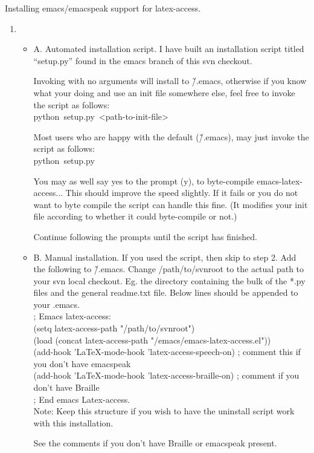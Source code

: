 \documentclass[12pt,a4paper]{report}
\begin{document}
Installing emacs/emacspeak support for latex-access.

\begin{enumerate}
\item
\begin{itemize}
  \item A. Automated installation script.
  I have built an installation script titled ``setup.py'' found in the emacs
branch of this svn checkout.

Invoking with no arguments will install to \~/.emacs, otherwise if you know
what your doing and use an init file somewhere else, feel free to invoke
the script as follows:\\
\mbox{python setup.py <path-to-init-file>}

Most users who are happy with the default (\~/.emacs), may just invoke
the script as follows:\\
\mbox{python setup.py}

You may as well say yes to the prompt (y), to byte-compile
emacs-latex-access... This should improve the speed slightly. If it
fails or you do not want to byte compile the script can handle this
fine. (It modifies your init file according to whether it could
byte-compile or not.)

Continue following the prompts until the script has finished.
\item B. Manual installation. If you used the script, then skip to step
  2.
  Add the following to \~/.emacs. Change /path/to/svnroot to the actual
path to your svn local checkout. Eg. the directory containing the bulk
of the *.py files and the general readme.txt file.
Below lines should be appended to your .emacs.\\

; Emacs latex-access:\\
(setq latex-access-path "/path/to/svnroot")\\
(load (concat latex-access-path "/emacs/emacs-latex-access.el"))\\
(add-hook 'LaTeX-mode-hook 'latex-access-speech-on) ; comment this if you don't have emacspeak\\
(add-hook 'LaTeX-mode-hook 'latex-access-braille-on) ; comment if you don't have Braille \\
; End emacs Latex-access.\\

Note: Keep this structure if you wish to have the uninstall script work
with this installation.

See the comments if you don't have Braille or emacspeak present.


\end{itemize}
\end{enumerate}
\end{document}

